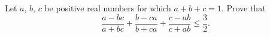 Let $ a$,  $ b$,  $ c$ be positive real numbers for which $ a + b + c = 1$. Prove that\[ {\frac{a-bc}{a+bc}} + {\frac{b-ca}{b+ca}} + {\frac{c-ab}{c+ab}} \leq \frac{3}{2}.\]
